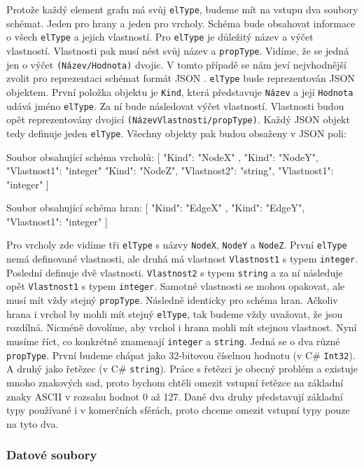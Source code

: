 Protože každý element grafu má svůj \verb+elType+, budeme mít na vstupu dva soubory schémat. 
Jeden pro hrany a jeden pro vrcholy.
Schéma bude obsahovat informace o všech \verb+elType+ a jejich vlastností.
Pro \verb+elType+ je důležitý název a výčet vlastností.
Vlastnosti pak musí nést svůj název a \verb+propType+.
Vidíme, že se jedná jen o výčet \verb+(Název/Hodnota)+ dvojic.
V tomto případě se nám jeví nejvhodnější zvolit pro reprezentaci schémat formát JSON \citep{json}.
\verb+elType+ bude reprezentován JSON objektem. 
První položka objektu je \verb+Kind+, která představuje \texttt{Název} a její \texttt{Hodnota} udává jméno \verb+elType+.
Za ní bude následovat výčet vlastností.
Vlastnosti budou opět reprezentovány dvojicí \verb+(NázevVlastnosti/propType)+.
Každý JSON objekt tedy definuje jeden \texttt{elType}.
Všechny objekty pak budou obsaženy v JSON poli:
\begin{code}
Soubor obsahující schéma vrcholů:
[    { "Kind": "NodeX" }, 
     { "Kind": "NodeY", "Vlastnost1": "integer" } 
     { "Kind": "NodeZ", "Vlastnost2": "string", 
       "Vlastnost1": "integer" }  ]

Soubor obsahující schéma hran:
[    { "Kind": "EdgeX" }, 
     { "Kind": "EdgeY", "Vlastnost1": "integer" } ]
\end{code}
Pro vrcholy zde vidíme tři \texttt{elType} s názvy \texttt{NodeX}, \texttt{NodeY} a \texttt{NodeZ}.
První \texttt{elType} nemá definované vlastnosti, ale druhá má vlastnost \texttt{Vlastnost1} s typem \texttt{integer}.
Poslední definuje dvě vlastnosti.
\texttt{Vlastnost2} s typem \texttt{string} a za ní následuje opět \texttt{Vlastnost1} s typem \texttt{integer}.
Samotné vlastnosti se mohou opakovat, ale musí mít vždy stejný \texttt{propType}.
Následně identicky pro schéma hran.
Ačkoliv hrana i vrchol by mohli mít stejný \texttt{elType}, tak budeme vždy uvažovat, že jsou rozdílná.
Nicméně dovolíme, aby vrchol i hrana mohli mít stejnou vlastnost.
Nyní musíme říct, co konkrétně znamenají \texttt{integer} a \texttt{string}.
Jedná se o dva různé \texttt{propType}.
První budeme chápat jako 32-bitovou číselnou hodnotu (v C\# \texttt{Int32}).
A druhý jako řetězec (v C\# \texttt{string}).
Práce s řetězci je obecný problém a existuje mnoho znakových sad, proto bychom chtěli omezit vstupní řetězce na základní znaky ASCII v rozsahu hodnot 0 až 127.  
Dané dva druhy představují základní typy používané i v komerčních sférách, proto chceme omezit vstupní typy pouze na tyto dva.

\subsubsection{Datové soubory}

